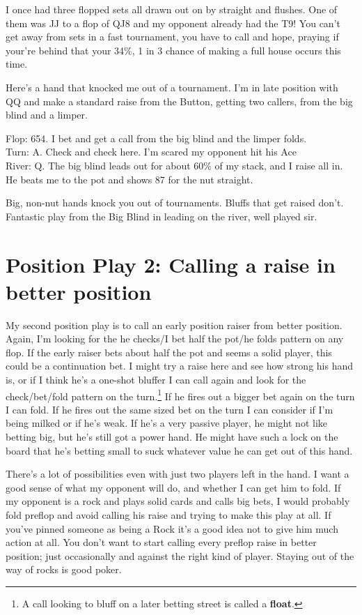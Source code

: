 I once had three flopped sets all drawn out on by straight and
flushes. One of them was JJ to a flop of QJ8 and my opponent already
had the T9! You can't get away from sets in a fast tournament, you
have to call and hope, praying if your're behind that your 34\%, 1 in
3 chance of making a full house occurs this time.

Here's a hand that knocked me out of a tournament.
I'm in late position with QQ and make a standard raise from the Button,
getting two callers, from the big blind and a limper.

Flop: 654. I bet and get a call from the big blind and the limper folds. \\
Turn: A. Check and check here. I'm scared my opponent hit his Ace \\
River: Q.  The big blind leads out for about 60\% of my stack, and I raise all
in. He beats me to the pot and shows 87 for the nut straight.

Big, non-nut hands knock you out of tournaments. Bluffs that get
raised don't. Fantastic play from the Big Blind in leading on the
river, well played sir.

\section{Position Play 2: Calling a raise in better position}

My second position play is to call an early position raiser from better
position. Again, I'm looking for the he checks/I bet half the pot/he folds
pattern on any flop. If the early raiser bets about half the
pot and seems a solid player, this could be a continuation bet. I might
try a raise here and see how strong his hand is, or if I think he's a
one-shot bluffer I can call again and look for the check/bet/fold
pattern on the turn.\footnote{A call looking to bluff on a later betting
street is called a \textbf{float}.} If he fires out a bigger bet again
on the turn I
can fold. If he fires out the same sized bet on the turn I can consider if
I'm being milked or if he's weak. If he's a very passive player,
he might not like betting big, but he's still got a power hand. He
might have such a lock on the board that he's betting small to suck
whatever value he can get out of this hand.

There's a lot of possibilities even with just two players left in the hand.
I want a good sense of what my opponent will do, and whether I can
get him to fold. If my opponent is a rock and plays solid cards
and calls big bets, I would probably fold preflop and avoid calling his raise
and trying to make this play at all. If you've pinned someone as being
a Rock it's a good idea not to give him much action at all. You don't
want to start calling every preflop raise in better position;
just occasionally and against the right kind of player. Staying
out of the way of rocks is good poker.

